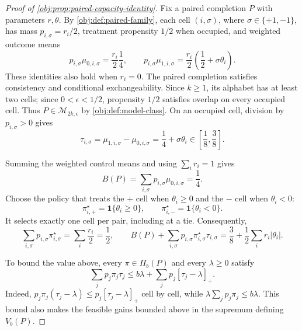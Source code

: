 \documentclass[11pt]{article}
\begin{document}
\begin{proof}[Proof of \cref{obj:prop:paired-capacity-identity}]
Fix a paired completion \(P\) with parameters \(r,\theta\). By \cref{obj:def:paired-family}, each cell \((i,\sigma)\), where \(\sigma\in\{+1,-1\}\), has mass \(p_{i,\sigma}=r_i/2\), treatment propensity \(1/2\) when occupied, and weighted outcome means
\[
p_{i,\sigma}\mu_{0,i,\sigma}=\frac{r_i}{2}\frac14,
\qquad
p_{i,\sigma}\mu_{1,i,\sigma}
=\frac{r_i}{2}\left(\frac12+\sigma\theta_i\right).
\] %
These identities also hold when \(r_i=0\). The paired completion satisfies consistency and conditional exchangeability. Since \(k\geq1\), its alphabet has at least two cells; since \(0<\epsilon<1/2\), propensity \(1/2\) satisfies overlap on every occupied cell. Thus \(P\in\mathcal M_{2k,\epsilon}\) by \cref{obj:def:model-class}. On an occupied cell, division by \(p_{i,\sigma}>0\) gives
\[
\tau_{i,\sigma}
=\mu_{1,i,\sigma}-\mu_{0,i,\sigma}
=\frac14+\sigma\theta_i
\in\left[\frac18,\frac38\right].
\] %

Summing the weighted control means and using \(\sum_i r_i=1\) gives
\[
B(P)=\sum_{i,\sigma}p_{i,\sigma}\mu_{0,i,\sigma}=\frac14.
\] %
Choose the policy that treats the \(+\) cell when \(\theta_i\geq0\) and the \(-\) cell when \(\theta_i<0\):
\[
\pi^\star_{i,+}=\mathbf1\{\theta_i\geq0\},
\qquad
\pi^\star_{i,-}=\mathbf1\{\theta_i<0\}.
\]
It selects exactly one cell per pair, including at a tie. Consequently,
\[
\sum_{i,\sigma}p_{i,\sigma}\pi^\star_{i,\sigma}
=\sum_i\frac{r_i}{2}=\frac12,
\qquad
B(P)+\sum_{i,\sigma}p_{i,\sigma}\pi^\star_{i,\sigma}\tau_{i,\sigma}
=\frac38+\frac12\sum_i r_i|\theta_i|.
\] %

To bound the value above, every \(\pi\in\Pi_b(P)\) and every \(\lambda\geq0\) satisfy
\[
\sum_j p_j\pi_j\tau_j
\leq b\lambda+\sum_j p_j[\tau_j-\lambda]_+.
\]
Indeed, \(p_j\pi_j(\tau_j-\lambda)\leq p_j[\tau_j-\lambda]_+\) cell by cell, while \(\lambda\sum_jp_j\pi_j\leq b\lambda\). This bound also makes the feasible gains bounded above in the supremum defining \(V_b(P)\). %


\end{proof}
\end{document}
